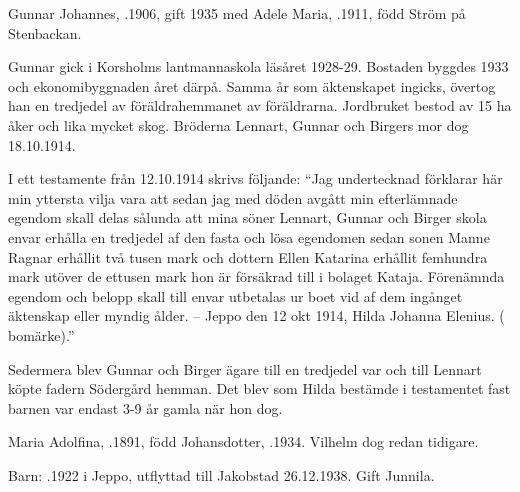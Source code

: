 Gunnar Johannes, .1906, gift 1935 med Adele Maria, .1911, född Ström på Stenbackan.
\begin{jhchildren}
  \item {}
  \item {}
  \item {}
  \item {}
\end{jhchildren}
Gunnar gick i Korsholms lantmannaskola läsåret 1928-29. Bostaden byggdes 1933 och ekonomibyggnaden året därpå. Samma år som äktenskapet ingicks, övertog han en tredjedel av föräldrahemmanet av föräldrarna. Jordbruket bestod av 15 ha åker och lika mycket skog. Bröderna Lennart, Gunnar och Birgers mor dog 18.10.1914.

I ett testamente från 12.10.1914 skrivs följande: ``Jag undertecknad förklarar här min yttersta vilja vara att sedan jag 	med döden avgått min efterlämnade egendom skall delas sålunda att mina söner Lennart, Gunnar och Birger skola envar erhålla en tredjedel af den fasta och lösa egendomen sedan sonen Manne Ragnar erhållit två tusen mark och dottern Ellen Katarina erhållit femhundra mark utöver de ettusen mark hon är försäkrad till i bolaget Kataja. Förenämnda egendom och belopp skall till envar utbetalas ur boet vid af dem ingånget äktenskap eller myndig ålder. -- Jeppo den 12 okt 1914, Hilda Johanna Elenius. ( bomärke).''

Sedermera blev Gunnar och Birger ägare till en tredjedel var och till Lennart köpte fadern Södergård hemman. Det blev som Hilda bestämde i testamentet fast barnen var endast 3-9 år gamla när hon dog.





Maria Adolfina, .1891, född Johansdotter, .1934.	Vilhelm dog redan tidigare.

Barn:  .1922 i Jeppo, utflyttad till Jakobstad 26.12.1938. Gift Junnila.


